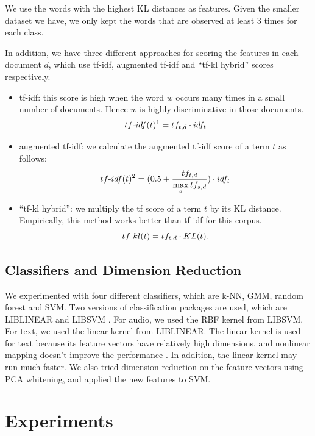 \documentclass[a4paper]{article}
\begin{document}
We use the words with the highest KL distances as features. Given the smaller dataset we have, we only kept the words that are observed at least 3 times for each class.

In addition, we have three different approaches for scoring the features in each document $d$, which use tf-idf, augmented tf-idf and ``tf-kl hybrid'' scores respectively.
\begin{itemize}
\item tf-idf: this score is high when the word $w$ occurs many times in a small number of documents. Hence $w$ is highly discriminative in those documents.
\begin{equation}
  tf\textnormal{-} idf(t)^1 =tf_{t,d} \cdot idf_{t} 
\label{tfidf1}
\end{equation}

\item augmented tf-idf:  we calculate the augmented tf-idf score of a term $t$ as follows:
\begin{equation}
  tf\textnormal{-} idf(t)^2 = (0.5 + \frac{tf_{t,d}}{\underset{s}{\max}\, tf_{s,d}}) \cdot idf_{t} 
\label{tfidf}
\end{equation}

\item ``tf-kl hybrid'': we multiply the tf score of a term $t$ by its KL distance. Empirically, this method works better than tf-idf for this corpus.
\begin{equation}
  tf\textnormal{-} kl(t) = tf_{t,d} \cdot KL(t).
\label{tfkl}
\end{equation}
\end{itemize}


\subsection{Classifiers and Dimension Reduction}
We experimented with four different classifiers, which are k-NN, GMM, random forest and SVM. Two versions of classification packages are used, which are LIBLINEAR \cite{liblin} and LIBSVM \cite{libsvm}. For audio, we used the RBF kernel from LIBSVM. For text, we used the linear kernel from LIBLINEAR. The linear kernel is used for text because its feature vectors have relatively high dimensions, and nonlinear mapping doesn't improve the performance \cite{svmguide}. In addition, the linear kernel may run much faster. We also tried dimension reduction on the feature vectors using PCA whitening, and applied the new features to SVM.

\section{Experiments}
\end{document}
